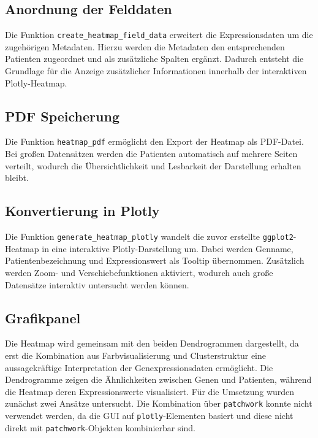\documentclass[12pt]{article}
\begin{document}
\subsection{Anordnung der Felddaten}

Die Funktion \texttt{create\_heatmap\_field\_data} erweitert die Expressionsdaten um die zugehörigen Metadaten. Hierzu werden die Metadaten den entsprechenden Patienten zugeordnet und als zusätzliche Spalten ergänzt. Dadurch entsteht die Grundlage für die Anzeige zusätzlicher Informationen innerhalb der interaktiven Plotly-Heatmap.

\subsection{PDF Speicherung}

Die Funktion \texttt{heatmap\_pdf} ermöglicht den Export der Heatmap als PDF-Datei. Bei großen Datensätzen werden die Patienten automatisch auf mehrere Seiten verteilt, wodurch die Übersichtlichkeit und Lesbarkeit der Darstellung erhalten bleibt.

\subsection{Konvertierung in Plotly}

Die Funktion \texttt{generate\_heatmap\_plotly} wandelt die zuvor erstellte \texttt{ggplot2}-Heatmap in eine interaktive Plotly-Darstellung um. Dabei werden Genname, Patientenbezeichnung und Expressionswert als Tooltip übernommen. Zusätzlich werden Zoom- und Verschiebefunktionen aktiviert, wodurch auch große Datensätze interaktiv untersucht werden können.

\subsection{Grafikpanel}

Die Heatmap wird gemeinsam mit den beiden Dendrogrammen dargestellt, da erst die Kombination aus Farbvisualisierung und Clusterstruktur eine aussagekräftige Interpretation der Genexpressionsdaten ermöglicht. Die Dendrogramme zeigen die Ähnlichkeiten zwischen Genen und Patienten, während die Heatmap deren Expressionswerte visualisiert.
Für die Umsetzung wurden zunächst zwei Ansätze untersucht. Die Kombination über \texttt{patchwork} konnte nicht verwendet werden, da die GUI auf \texttt{plotly}-Elementen basiert und diese nicht direkt mit \texttt{patchwork}-Objekten kombinierbar sind.
\end{document}
